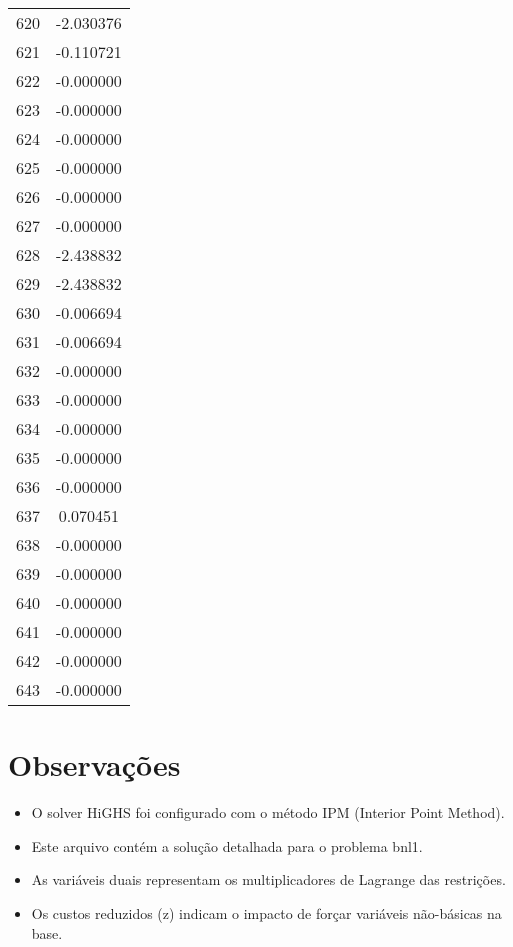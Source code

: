 \documentclass[12pt]{article}
\begin{document}
\begin{longtable}{@{}cc@{}}
620 & -2.030376 \\
621 & -0.110721 \\
622 & -0.000000 \\
623 & -0.000000 \\
624 & -0.000000 \\
625 & -0.000000 \\
626 & -0.000000 \\
627 & -0.000000 \\
628 & -2.438832 \\
629 & -2.438832 \\
630 & -0.006694 \\
631 & -0.006694 \\
632 & -0.000000 \\
633 & -0.000000 \\
634 & -0.000000 \\
635 & -0.000000 \\
636 & -0.000000 \\
637 & 0.070451 \\
638 & -0.000000 \\
639 & -0.000000 \\
640 & -0.000000 \\
641 & -0.000000 \\
642 & -0.000000 \\
643 & -0.000000 \\

\end{longtable}


\section{Observações}

\begin{itemize}
\item O solver HiGHS foi configurado com o método IPM (Interior Point Method).
\item Este arquivo contém a solução detalhada para o problema bnl1.
\item As variáveis duais representam os multiplicadores de Lagrange das restrições.
\item Os custos reduzidos (z) indicam o impacto de forçar variáveis não-básicas na base.
\end{itemize}
\end{document}
